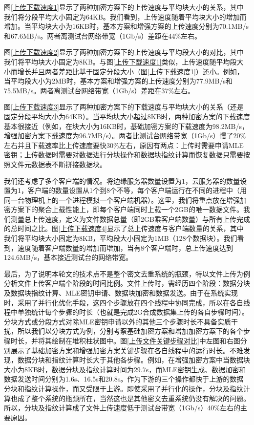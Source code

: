 \documentclass[promaster]{thesis-uestc}
\begin{document}
图\ref{上传下载速度1}显示了两种加密方案下的上传速度与平均块大小的关系，其中我们将分段平均大小固定为64KB。我们看到，上传速度随着平均块大小的增加而增加。当平均块大小为16KB时，基本方案和增强方案的上传速度分别为70.1MB/s和67.6MB/s。两者离测试台网络带宽（1Gb/s）差距在44\%左右。

图\ref{上传下载速度2}显示了两种加密方案下的上传速度与平均段大小的对比，其中我们将平均块大小固定为8KB。与图\ref{上传下载速度1}类似，上传速度随平均段大小而增长并且两者差距比基于固定分段大小（图\ref{上传下载速度1}）还小。例如，当平均段大小为2MB时，基本方案和增强方案的上传速度分别为77.9MB/s和75.5MB/s。两者离测试台网络带宽（1Gb/s）差距在37\%左右。

图\ref{上传下载速度3}显示了两种加密方案下的下载速度与平均块大小的关系（还是固定分段平均大小为64KB）。当平均块大小超过8KB时，两种加密方案的下载速度基本很接近（例如，在块大小为16KB时，基础加密方案的下载速度为98.2MB/s，增强加密方案下载速度为96.7MB/s）。两者比测试台网络带宽（1Gb/s）慢了20\%左右并且下载速率比上传速度要快30\%左右，原因有两点：上传时需要申请MLE密钥；上传数据时需要对数据进行分块操作和数据块指纹计算而恢复数据只需要按照文件元数据表不断拼接数据块。

我们还考虑了多个客户端的情况。将边缘服务器数量设置为1，云服务器的数量设置为1，客户端的数量设置从1个到8个不等，每个客户端运行在不同的进程中（用同一台物理机上的一个进程模拟一个客户端机器）。这里，我们将重点放在增强加密方案下的聚合上载性能上，即每个客户端同时上载一个2GB的唯一数据文件。我们测量总上传速度，定义为文件数据总量（即2GB乘客户端数量）与所有上传完成的总时间之比。图\ref{上传下载速度4}显示了总上传速度与客户端数量的关系，其中我们将平均块大小固定为8KB，平均段大小固定为1MB（128个数据块）。我们看到，速度随着客户端数量的增加而增加，当有8个客户端时，总上传速度达到124.6MB/s，基本接近测试台的网络带宽。

最后，为了说明本轮文的技术点不是整个密文去重系统的瓶颈，特以文件上传为例分析文件上传客户端个阶段的时间比例。文件上传时，需经历四个阶段：数据分块及数据块指纹计算、MLE密钥申请、数据块加密和数据发送。由于在系统实现时，采用了并行化优化手段，这四个步骤放在四个线程中协同完成，所以在各自线程中单独统计每个步骤的时长（也就是完成2G合成数据集上传的各自步骤时间）。分块方式或分段方式对除MLE密钥申请以外的其他三个步骤时长不具备实质干扰，所以我们以分块方式为例，分别考察基础加密方案和增加加密方案下的各个步骤时长，并将其绘制在堆积柱状图中。图\ref{上传文件关键步骤对比}中左图和右图分别展示了基础加密方案和增强加密方案关键步骤在各自线程中的运行时长。不难发现，数据分块和指纹计算时长大于其他各步骤。例如，在增强加密方案中当数据块大小为8KB时，数据分块及指纹计算时间为29.7s，而MLE密钥生成、数据加密和数据发送时间分别为1.6s、16.5s和20.8s。作为下游的三个操作都快于上游的数据分块和指纹计算操作，而又受限于上游。即使采用了并行化的操作，分块及指纹计算也成了整个系统的瓶颈所在，当然这也是其他密文去重系统仍没有解决的问题。所以，分块及指纹计算成了文件上传速度低于测试台带宽（1Gb/s）40\%左右的主要原因。
\end{document}
